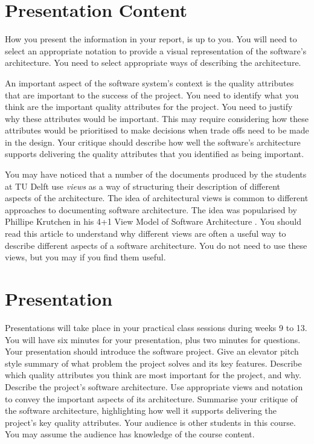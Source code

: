 \documentclass{csse4400}
\begin{document}
\section{Presentation Content}
How you present the information in your report, is up to you. You will need to select an appropriate notation 
to provide a visual representation of the software's architecture. You need to select appropriate ways of describing
the architecture.

An important aspect of the software system's context is the quality attributes that are important to the success of the project.
You need to identify what you think are the important quality attributes for the project. 
You need to justify why these attributes would be important.
This may require considering how these attributes would be prioritised to make decisions when trade offs need to be made in the design.
Your critique should describe how well the software's architecture supports delivering the quality attributes that you identified as being important.

You may have noticed that a number of the documents produced by the students at TU Delft use \textsl{views} 
as a way of structuring their description of different aspects of the architecture. The idea of architectural views
is common to different approaches to documenting software architecture. The idea was popularised by Phillipe 
Krutchen in his 4+1 View Model of Software Architecture \cite{4+1-model}.
You should read this article to understand why different views are often a useful way to describe different
aspects of a software architecture. You do not need to use these views, but you may if you find them useful.

\section{Presentation}
Presentations will take place in your practical class sessions during weeks 9 to 13.
You will have six minutes for your presentation, plus two minutes for questions.
Your presentation should introduce the software project.
Give an elevator pitch style summary of what problem the project solves and its key features.
Describe which quality attributes you think are most important for the project, and why.
Describe the project's software architecture. Use appropriate views and notation to convey the important aspects of its architecture.
Summarise your critique of the software architecture, highlighting how well it supports delivering the project's key quality attributes.
Your audience is other students in this course. You may assume the audience has knowledge of the course content.
\end{document}
